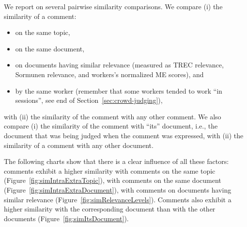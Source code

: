 We report on several pairwise similarity comparisons. 
We compare (i) the similarity of a comment:
\begin{itemize}
\item on the same topic,
\item on the same document,
\item on  documents having similar relevance (measured as TREC
  relevance, Sormunen relevance, and workers's normalized ME
  scores), and
\item by the same worker (remember that some workers tended to work
  ``in sessions'', see
  end of Section~\ref{sec:crowd-judging}),
\end{itemize}
with (ii)  the similarity of the comment with any other comment.
We also compare (i) the similarity of the comment with ``its'' document,
i.e., the document that was being judged when the comment was
expressed, with (ii) the similarity of a comment with any other document.

The following charts show that there is a clear influence of all these
factors: comments exhibit a higher similarity with comments on the
same topic (Figure~\ref{fig:simIntraExtraTopic}), with comments on the
same document (Figure~\ref{fig:simIntraExtraDocument}), with comments
on documents having similar relevance
(Figure~\ref{fig:simRelevanceLevels}). 
Comments also exhibit a higher similarity with the corresponding
document than with the other documents
(Figure~\ref{fig:simItsDocument}).

